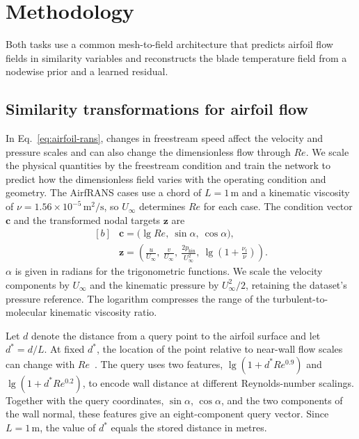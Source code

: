 \documentclass[a4paper,fleqn]{cas-sc}
\begin{document}
\section{Methodology}\label{sec:methodology}
\par

Both tasks use a common mesh-to-field architecture that predicts airfoil flow
fields in similarity variables and reconstructs the blade temperature field from
a nodewise prior and a learned residual.

\subsection{Similarity transformations for airfoil flow}\label{subsec:airfoil-similarity}
\par

In Eq.~\eqref{eq:airfoil-rans}, changes in freestream speed affect the velocity and pressure
scales and can also change the dimensionless flow through $Re$. We scale the physical
quantities by the freestream condition and train the network to predict how the
dimensionless field varies with the operating condition and geometry. The AirfRANS cases
use a chord of $L=1\,\mathrm{m}$ and a kinematic viscosity of
$\nu=1.56\times10^{-5}\,\mathrm{m^2/s}$, so $U_\infty$ determines $Re$ for each case.
The condition vector $\mathbf{c}$ and the transformed nodal targets $\mathbf{z}$ are
\begin{equation}
  \label{eq:airfoil-forward}
  \begin{aligned}[b]
    &\mathbf{c} = \bigl(\lg Re,\ \sin\alpha,\ \cos\alpha\bigr), \\
    &\mathbf{z} = \left(
      \frac{u}{U_\infty},\ \frac{v}{U_\infty},\
      \frac{2p_{\mathrm{kin}}}{U_\infty^2},\
      \lg\!\left(1+\frac{\nu_t}{\nu}\right)
    \right).
  \end{aligned}
\end{equation}
$\alpha$ is given in radians for the trigonometric functions. We scale the velocity
components by $U_\infty$ and the kinematic
pressure by $U_\infty^2/2$, retaining the dataset's pressure reference. The logarithm
compresses the range of the turbulent-to-molecular kinematic viscosity ratio.

Let $d$ denote the distance from a query point to the airfoil surface and let $d^*=d/L$.
At fixed $d^*$, the location of the point relative to near-wall flow scales can change
with $Re$~\citep{Schlichting2017}. The query uses two features, $\lg(1+d^*Re^{0.9})$ and
$\lg(1+d^*Re^{0.2})$, to encode wall distance at different Reynolds-number scalings.
Together with the query coordinates, $\sin\alpha$, $\cos\alpha$, and the two components
of the wall normal, these features give an eight-component query vector. Since
$L=1\,\mathrm{m}$, the value of $d^*$ equals the stored distance in metres.
\end{document}
